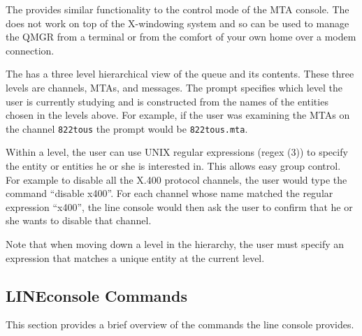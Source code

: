 The  provides similar functionality to the control
mode of the MTA console.  The  does not work on top
of the X-windowing system and so can be used to manage the QMGR from a
terminal or from the comfort of your own home over a modem connection.

The  has a three level hierarchical view of the queue
and its contents.  These three levels are channels, MTAs, and
messages.  The prompt specifies which level the user is currently
studying and is constructed from the names of the entities chosen in
the levels above.  For example, if the user was examining the MTAs on
the channel
\verb+822tous+ the prompt would be \verb+822tous.mta+.

Within a level, the user can use UNIX regular expressions (\man regex
(3)) to specify the entity or entities he or she is interested in.
This allows easy group control.
For example to disable all the X.400 protocol channels, the user would
type the command ``disable x400''.
For each channel whose name matched the regular expression ``x400'',
the line console would then ask the user to confirm that he or she
wants to disable that channel.

Note that when moving down a level in the hierarchy, the user must
specify an expression that matches a unique entity at the current
level.

\subsection	{LINEconsole Commands}

This section provides a brief overview of the commands the line
console provides.

